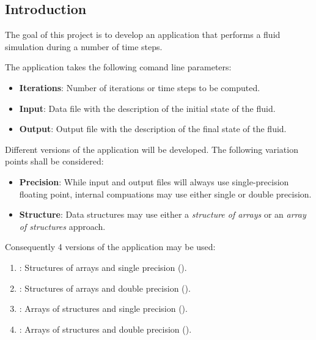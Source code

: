 \subsection{Introduction}

The goal of this project is to develop an application that performs a fluid
simulation during a number of time steps.

The application takes the following comand line parameters:
\begin{itemize}
\item \textbf{Iterations}: Number of iterations or time steps to be computed.
\item \textbf{Input}: Data file with the description of the initial state of the
fluid.
\item \textbf{Output}: Output file with the description of the final state of
the fluid.
\end{itemize}

Different versions of the application will be developed. The following variation
points shall be considered:

\begin{itemize}

\item \textbf{Precision}: While input and output files will always use
single-precision floating point, internal compuations may use either single or
double precision.

\item \textbf{Structure}: Data structures may use either a \emph{structure of
arrays} or an \emph{array of structures} approach.

\end{itemize}

Consequently 4 versions of the application may be used:
\begin{enumerate}
\item {}: Structures of arrays and single precision ().
\item {}: Structures of arrays and double precision ().
\item {}: Arrays of structures and single precision ().
\item {}: Arrays of structures and double precision ().
\end{enumerate}

